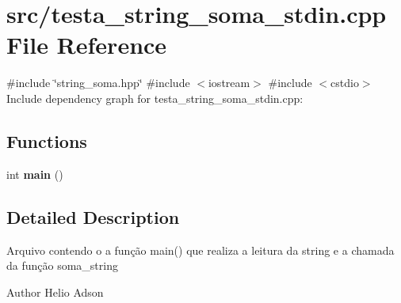 \section{src/testa\+\_\+string\+\_\+soma\+\_\+stdin.cpp File Reference}
\label{testa__string__soma__stdin_8cpp}
{\ttfamily \#include \char`\"{}string\+\_\+soma.\+hpp\char`\"{}}\newline
{\ttfamily \#include $<$iostream$>$}\newline
{\ttfamily \#include $<$cstdio$>$}\newline
Include dependency graph for testa\+\_\+string\+\_\+soma\+\_\+stdin.\+cpp\+:
\subsection*{Functions}
\begin{DoxyCompactItemize}
\item 
\mbox{\label{testa__string__soma__stdin_8cpp_ae66f6b31b5ad750f1fe042a706a4e3d4}} 
int {\bfseries main} ()
\end{DoxyCompactItemize}


\subsection{Detailed Description}
Arquivo contendo o a função main() que realiza a leitura da string e a chamada da função soma\+\_\+string

\begin{DoxyAuthor}{Author}
Helio Adson 
\end{DoxyAuthor}
